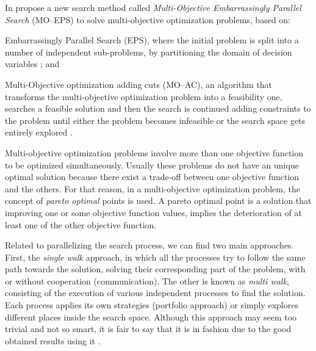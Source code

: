In \cite{Yasuhara2015}  propose a new search method called \textit{Multi-Objective Embarrassingly Parallel Search} (MO--EPS) to solve multi-objective optimization problems, based on: 
\begin{inparaenum}[i)]
	\item Embarrassingly Parallel Search (EPS), where the initial problem is split into a number of independent sub-problems, by partitioning the domain of decision variables \cite{Regin2014}; and %
	\item Multi-Objective optimization adding cuts (MO--AC), an algorithm that transforms the multi-objective optimization problem into a feasibility one, searches a feasible solution and then the search is continued adding constraints to the problem until either the problem becomes infeasible or the search space gets entirely explored \cite{Kotecha2010}.
\end{inparaenum}
Multi-objective optimization problems involve more than one objective function to be optimized simultaneously. Usually these problems do not have an unique optimal solution because there exist a trade-off between one objective function and the others. For that reason, in a multi-objective optimization problem, the concept of \textit{pareto optimal} points is used. A pareto optimal point is a solution that improving one or some objective function values, implies the deterioration of at least one of the other objective function. %

Related to parallelizing the search process, we can find two main approaches. First, the {\it single walk} approach, in which all the processes try to follow the same path towards the solution, solving their corresponding part of the problem, with or without cooperation (communication). The other is known as {\it multi walk}, consisting of the execution of various independent processes to find the solution. Each process applies its own strategies (portfolio approach) or simply explores different places inside the search space. Although this approach may seem too trivial and not so smart, it is fair to say that it is in fashion due to the good obtained results using it \cite{Diaz}.


